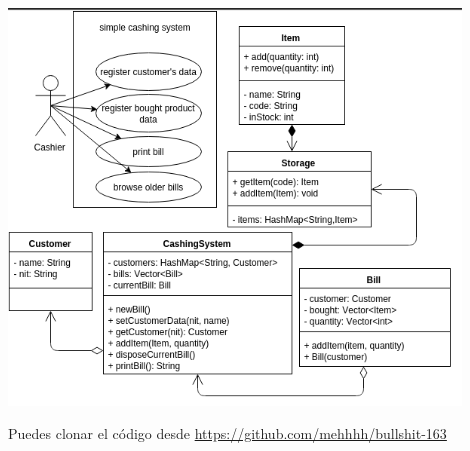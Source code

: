 \includegraphics[width=0.9\textwidth]{img/1-a.png}

Puedes clonar el código desde \url{https://github.com/mehhhh/bullshit-163}






